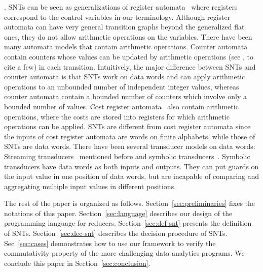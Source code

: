 \smallskip

.
SNTs can be seen as generalizations of register automata~\cite{KF94,NSV04} where registers correspond to the control variables in our terminology. Although register automata can have very general transition graphs beyond the generalized flat ones, they do not allow arithmetic operations on the variables. There have been many automata models that contain arithmetic operations. Counter automata contain counters whose values can be updated by arithmetic operations (see \cite{Iba78,CJ98,LS06,HH14,FGH13}, to cite a few) in each transition.  Intuitively, the major difference between SNTs and counter automata is that SNTs work on data words and can apply arithmetic operations to an unbounded number of independent integer values, whereas  counter automata contain a bounded number of counters which involve only  a bounded number of values. Cost register automata~\cite{ADD+13} also contain arithmetic operations, where the costs are stored into registers for which arithmetic operations can be applied. SNTs are different from cost register automata since the inputs of cost register automata are words on finite alphabets, while those of SNTs are data words. 
%
%
There have been several transducer models on data words: Streaming transducers~\cite{RP11} mentioned before and symbolic transducers~\cite{VHL+12}. Symbolic transducers have data words as both inputs and outputs. They can put guards on the input value in one position of data words, but are incapable of comparing and aggregating multiple input values in different positions. 

The rest of the paper is organized as follows. Section~\ref{sec:preliminaries} fixes the notations of this paper. Section~\ref{sec:language} describes our design of the programming language for reducers. Section~\ref{sec:def-snt} presents the definition of SNTs. Section~\ref{sec:dec-snt} describes the decision procedure of SNTs. Sec~\ref{sec:cases} demonstrates how to use our framework to verify the commutativity property of the more challenging data analytics programs. We conclude this paper in Section~\ref{sec:conclusion}. 